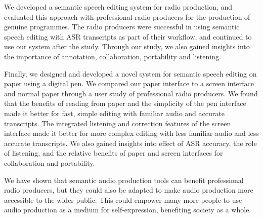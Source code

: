 We developed a semantic speech editing system for radio production, and evaluated this approach with professional radio
producers for the production of genuine programmes. The radio producers were successful in using semantic speech
editing with ASR transcripts as part of their workflow, and continued to use our system after the study. Through our
study, we also gained insights into the importance of annotation, collaboration, portability and listening.

Finally, we designed and developed a novel system for semantic speech editing on paper using a digital pen. We compared
our paper interface to a screen interface and normal paper through a user study of professional radio producers. We
found that the benefits of reading from paper and the simplicity of the pen interface made it better for fast, simple
editing with familiar audio and accurate transcripts.  The integrated listening and correction features of the screen
interface made it better for more complex editing with less familiar audio and less accurate transcripts.  We also
gained insights into effect of ASR accuracy, the role of listening, and the relative benefits of paper and screen
interfaces for collaboration and portability.

We have shown that semantic audio production tools can benefit professional radio producers, but they could also be
adapted to make audio production more accessible to the wider public. This could empower many more people to 
use audio production as a medium for self-expression, benefiting society as a whole.


